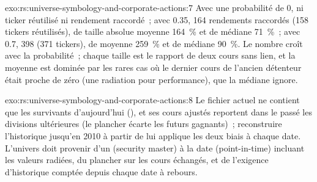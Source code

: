 \begin{solution}{exo:rs:universe-symbology-and-corporate-actions:7}
Avec une probabilité de 0, ni ticker réutilisé ni rendement raccordé~; avec 0.35, 164 rendements raccordés (158 tickers réutilisés), de taille absolue moyenne
164~\% et de médiane 71~\%~; avec 0.7, 398 (371 tickers), de moyenne 259~\% et de médiane 90~\%. Le nombre croît avec la probabilité~; chaque taille est le
rapport de deux cours sans lien, et la moyenne est dominée par les rares cas où le dernier cours de l'ancien détenteur était proche de zéro (une
radiation pour performance), que la médiane ignore.
\end{solution}

\begin{solution}{exo:rs:universe-symbology-and-corporate-actions:8}
Le fichier actuel ne contient que les survivants d'aujourd'hui (), et ses cours ajustés reportent dans le passé les divisions ultérieures (le
plancher écarte les futurs gagnants)~; reconstruire l'historique jusqu'en 2010 à partir de lui applique les deux biais à chaque date. L'univers doit provenir d'un
 (security master) à la date (point-in-time) incluant les valeurs radiées, du plancher sur les cours échangés, et de l'exigence d'historique comptée depuis chaque date
à rebours.
\end{solution}

